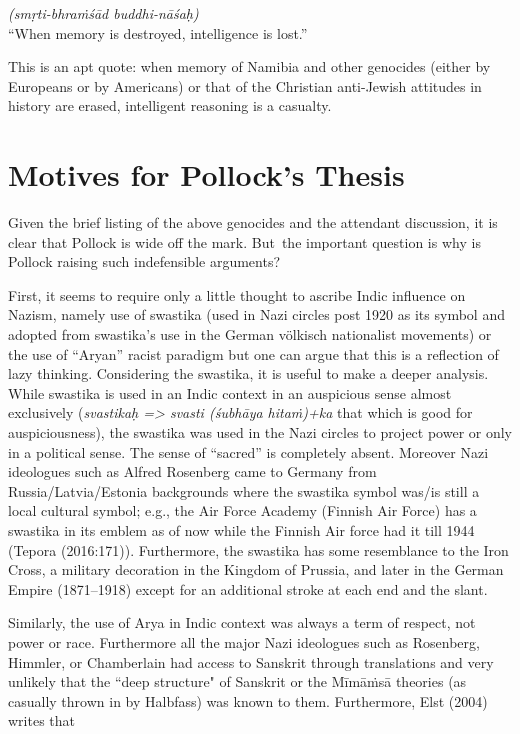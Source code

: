 \begin{myquote}
{\sl (smṛti-bhraṁśād buddhi-nāśaḥ)}\\
{\rm “When memory is destroyed, intelligence is lost.”}
\end{myquote}
This is an apt quote: when memory of Namibia and other genocides (either by Europeans or by Americans) or that of the Christian anti-Jewish attitudes in history are erased, intelligent reasoning is a casualty.\\[-20pt]


\section*{Motives for Pollock’s Thesis}
\vskip -5pt

Given the brief listing of the above genocides and the attendant discussion, it is clear that Pollock is wide off the mark. But~the important question is why is Pollock raising such indefensible arguments?

First, it seems to require only a little thought to ascribe Indic influence on Nazism, namely use of swastika (used in Nazi circles post 1920 as its symbol and adopted from swastika's use in the German völkisch nationalist movements) or the use of “Aryan” racist paradigm but one can argue that this is a reflection of lazy thinking. Considering the swastika, it is useful to make a deeper analysis. While swastika is used in an Indic context in an auspicious sense almost exclusively ({\sl svastikaḥ => svasti (śubhāya hitaṁ)+ka} that which is good for auspiciousness), the swastika was used in the Nazi circles to project power or only in a political sense. The sense of “sacred” is completely absent. Moreover Nazi ideologues such as Alfred Rosenberg came to Germany from Russia/Latvia/Estonia backgrounds where the swastika symbol was/is still a local cultural symbol; e.g., the Air Force Academy (Finnish Air Force) has a swastika in its emblem as of now while the Finnish Air force had it till 1944 (Tepora (2016:171)). Furthermore, the swastika has some resemblance to the Iron Cross, a military decoration in the Kingdom of Prussia, and later in the German Empire (1871–1918) except for an additional stroke at each end and the slant.

Similarly, the use of Arya in Indic context was always a term of respect, not power or race. Furthermore all the major Nazi ideologues such as Rosenberg, Himmler, or Chamberlain had access to Sanskrit through translations and very unlikely that the ``deep structure" of Sanskrit or the Mīmāṁsā theories (as casually thrown in by Halbfass) was known to them. Furthermore, Elst (2004) writes that 

